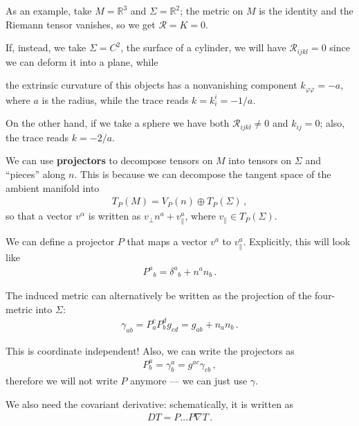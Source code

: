 \documentclass[main.tex]{subfiles}
\begin{document}
As an example, take \(M = \mathbb{R}^3\) and \(\Sigma = \mathbb{R}^2\); the metric on \(M\) is the identity and the Riemann tensor vanishes, so we get \(\mathcal{R} = K = 0\). 

If, instead, we take \(\Sigma = C^2\), the surface of a cylinder, we will have \(\mathcal{R}_{ijkl} = 0\) since we can deform it into a plane, while 
%
\begin{claim}
the extrinsic curvature of this objects has a nonvanishing component \(k_{\varphi \varphi } = - a\), where \(a\) is the radius, while the trace reads \(k = k^{i}_i = - 1/a\). 
\end{claim}

On the other hand, if we take a sphere we have both \(\mathcal{R}_{ijkl} \neq 0 \) and \(k_{ij} = 0\); also, the trace reads \(k = - 2 / a\). 

We can use \textbf{projectors} to decompose tensors on \(M\) into tensors on \(\Sigma \) and ``pieces'' along \(n\). 
This is because we can decompose the tangent space of the ambient manifold into 
%
\begin{align}
T_P(M) = V_P (n) \oplus T_P (\Sigma )
\,,
\end{align}
%
so that a vector \(v^{\alpha }\) is written as \(v_\perp n^a + v_\parallel^{a}\), where \(v_\parallel \in T_P (\Sigma )\). 

We can define a projector \(P\) that maps a vector \(v^{a}\) to \(v_\parallel^{a}\). Explicitly, this will look like 
%
\begin{align}
P^{a}{}_b = \delta^{a}{}_b + n^a n_b
\,.
\end{align}

The induced metric can alternatively be written as the projection of the four-metric into \(\Sigma \): 
%
\begin{align}
\gamma_{ab} = P_a^{c} P_b^{d} g_{cd} = g_{ab} + n_a n_b
\,.
\end{align}

This is coordinate independent! 
Also, we can write the projectors as 
%
\begin{align}
P^{a}_{b} = \gamma^{a}_{b} = g^{ac} \gamma_{cb}
\,,
\end{align}
%
therefore we will not write \(P\) anymore --- we can just use \(\gamma \). 

We also need the covariant derivative: schematically, it is written as
%
\begin{align}
D T = P \dots P \nabla T
\,.
\end{align}
\end{document}
